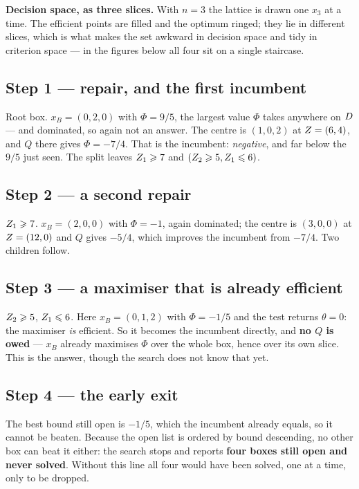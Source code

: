 \documentclass[11pt,a4paper]{article}
\begin{document}
\begin{center}
\end{center}
\noindent
\textbf{Decision space, as three slices.}  With $n = 3$ the lattice is drawn
one $x_3$ at a time.  The efficient points are filled and the optimum ringed;
they lie in different slices, which is what makes the set awkward in decision
space and tidy in criterion space --- in the figures below all four sit on a
single staircase.

\subsection*{Step 1 --- repair, and the first incumbent}
\begin{center}\end{center}
Root box.  $x_B = (0,2,0)$ with $\Phi = 9/5$, the largest value $\Phi$ takes
anywhere on $D$ --- and dominated, so again not an answer.  The centre is
$(1,0,2)$ at $Z = (6,4)$, and $Q$ there gives $\Phi = -7/4$.  That is the
incumbent: \emph{negative}, and far below the $9/5$ just seen.  The split leaves
$Z_1 \geqslant 7$ and $(Z_2 \geqslant 5, Z_1 \leqslant 6)$.

\subsection*{Step 2 --- a second repair}
\begin{center}\end{center}
$Z_1 \geqslant 7$.  $x_B = (2,0,0)$ with $\Phi = -1$, again dominated; the
centre is $(3,0,0)$ at $Z = (12,0)$ and $Q$ gives $-5/4$, which improves the
incumbent from $-7/4$.  Two children follow.

\subsection*{Step 3 --- a maximiser that is already efficient}
\begin{center}\end{center}
$Z_2 \geqslant 5$, $Z_1 \leqslant 6$.  Here $x_B = (0,1,2)$ with
$\Phi = -1/5$ and the test returns $\theta = 0$: the maximiser \emph{is}
efficient.  So it becomes the incumbent directly, and \textbf{no $Q$ is owed} ---
$x_B$ already maximises $\Phi$ over the whole box, hence over its own slice.
This is the answer, though the search does not know that yet.

\subsection*{Step 4 --- the early exit}
\begin{center}\end{center}
The best bound still open is $-1/5$, which the incumbent already equals, so it
cannot be beaten.  Because the open list is ordered by bound descending, no
other box can beat it either: the search stops and reports
\textbf{four boxes still open and never solved}.  Without this line all four
would have been solved, one at a time, only to be dropped.
\end{document}

